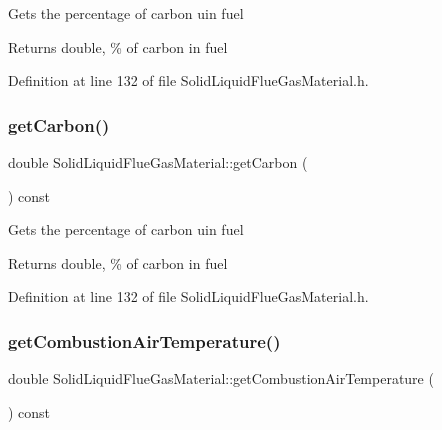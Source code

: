 Gets the percentage of carbon uin fuel \begin{DoxyReturn}{Returns}
double, \% of carbon in fuel 
\end{DoxyReturn}


Definition at line 132 of file Solid\+Liquid\+Flue\+Gas\+Material.\+h.

\mbox{\label{class_solid_liquid_flue_gas_material_a7b8a98111943d30094e2d6950f7f2ec1}} 
\subsubsection{\texorpdfstring{get\+Carbon()}{getCarbon()}\hspace{0.1cm}{\footnotesize\ttfamily [3/3]}}
{\footnotesize\ttfamily double Solid\+Liquid\+Flue\+Gas\+Material\+::get\+Carbon (\begin{DoxyParamCaption}{ }\end{DoxyParamCaption}) const\hspace{0.3cm}{\ttfamily [inline]}}

Gets the percentage of carbon uin fuel \begin{DoxyReturn}{Returns}
double, \% of carbon in fuel 
\end{DoxyReturn}


Definition at line 132 of file Solid\+Liquid\+Flue\+Gas\+Material.\+h.

\mbox{\label{class_solid_liquid_flue_gas_material_a8757b831e5a2ef26dbb0cf271c0e8207}} 
\subsubsection{\texorpdfstring{get\+Combustion\+Air\+Temperature()}{getCombustionAirTemperature()}\hspace{0.1cm}{\footnotesize\ttfamily [1/3]}}
{\footnotesize\ttfamily double Solid\+Liquid\+Flue\+Gas\+Material\+::get\+Combustion\+Air\+Temperature (\begin{DoxyParamCaption}{ }\end{DoxyParamCaption}) const\hspace{0.3cm}{\ttfamily [inline]}}

